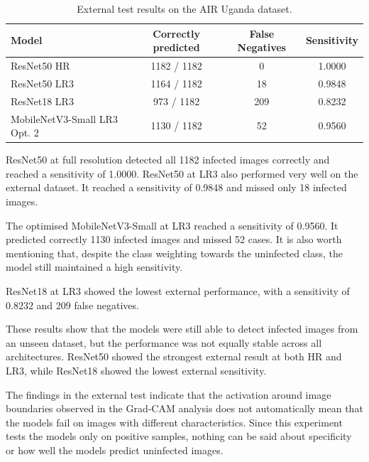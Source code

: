\begin{table}[htbp]
    \centering
    \caption{External test results on the AIR Uganda dataset.}
    \label{tab:uganda_results}

    \small
    \setlength{\tabcolsep}{5pt}

    \begin{tabular}{|l|c|c|c|}
        \hline
        \textbf{Model} & \textbf{Correctly predicted} &
        \textbf{False Negatives} & \textbf{Sensitivity} \\ \hline
        ResNet50 HR & 1182 / 1182 & 0 & 1.0000 \\ \hline
        ResNet50 LR3 & 1164 / 1182 & 18 & 0.9848 \\ \hline
        ResNet18 LR3 & 973 / 1182 & 209 & 0.8232 \\ \hline
        MobileNetV3-Small LR3 Opt. 2 & 1130 / 1182 & 52 & 0.9560 \\ \hline
    \end{tabular}
\end{table}

\FloatBarrier

ResNet50 at full resolution detected all 1182 infected images correctly and reached a sensitivity of 1.0000. ResNet50 at LR3 also performed very well on the external dataset. It reached a sensitivity of 0.9848 and missed only 18 infected images.

The optimised MobileNetV3-Small at LR3 reached a sensitivity of 0.9560. It predicted correctly 1130 infected images and missed 52 cases. It is also worth mentioning that, despite the class weighting towards the uninfected class, the model still maintained a high sensitivity.

ResNet18 at LR3 showed the lowest external performance, with a sensitivity of 0.8232 and 209 false negatives. 

These results show that the models were still able to detect infected images from an unseen dataset, but the performance was not equally stable across all architectures. ResNet50 showed the strongest external result at both HR and LR3, while ResNet18 showed the lowest external sensitivity.

The findings in the external test indicate that the activation around image boundaries observed in the Grad-CAM analysis does not automatically mean that the models fail on images with different characteristics. Since this experiment tests the models only on positive samples, nothing can be said about specificity or how well the models predict uninfected images.

